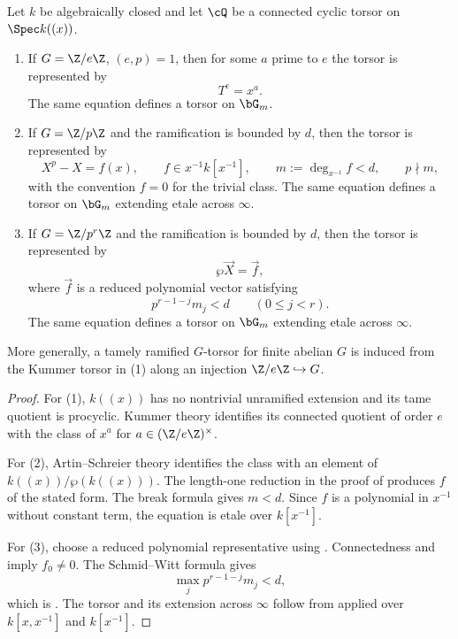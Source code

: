 \begin{lemma}
\label{lemma:realization_over_Gm}\label{lemma:realization_over_Gm_Wr}
Let $k$ be algebraically closed and let $\cQ$ be a connected cyclic torsor on
$\Spec k((x))$.
\begin{enumerate}
 \item If $G=\Z/e\Z$, $(e,p)=1$, then for some $a$ prime to $e$ the torsor is
 represented by
 \[
     T^e=x^a.
 \]
 The same equation defines a torsor on $\bG_m$.
 \item If $G=\Z/p\Z$ and the ramification is bounded by $d$, then the torsor is
 represented by
 \[
     X^p-X=f(x),\qquad f\in x^{-1}k[x^{-1}],\qquad
     m:=\deg_{x^{-1}}f<d,\qquad p\nmid m,
 \]
 with the convention $f=0$ for the trivial class. The same equation defines a
 torsor on $\bG_m$ extending etale across $\infty$.
 \item If $G=\Z/p^r\Z$ and the ramification is bounded by $d$, then the torsor
 is represented by
 \[
     \wp\vec X=\vec f,
 \]
 where $\vec f$ is a reduced polynomial vector satisfying
 \begin{equation}\label{eq:parallel_witt_pole_bound}
       p^{r-1-j}m_j<d\qquad(0\leq j<r).
 \end{equation}
 The same equation defines a torsor on $\bG_m$ extending etale across
 $\infty$.
\end{enumerate}
More generally, a tamely ramified $G$-torsor for finite abelian $G$ is induced
from the Kummer torsor in (1) along an injection $\Z/e\Z\hookrightarrow G$.
\end{lemma}
\begin{proof}
For (1), $k((x))$ has no nontrivial unramified extension and its tame quotient
is procyclic. Kummer theory identifies its connected quotient of order $e$
with the class of $x^a$ for $a\in(\Z/e\Z)^\times$.

For (2), Artin--Schreier theory identifies the class with an element of
$k((x))/\wp(k((x)))$. The length-one reduction in the proof of
 produces $f$ of the stated
form. The break formula gives $m<d$. Since $f$ is a polynomial in $x^{-1}$
without constant term, the equation is etale over $k[x^{-1}]$.

For (3), choose a reduced polynomial representative using
. Connectedness and
 imply $f_0\neq0$. The
Schmid--Witt formula gives
\[
   \max_j p^{r-1-j}m_j<d,
\]
which is . The torsor and its extension
across $\infty$ follow from  applied over
$k[x,x^{-1}]$ and $k[x^{-1}]$.
\end{proof}


